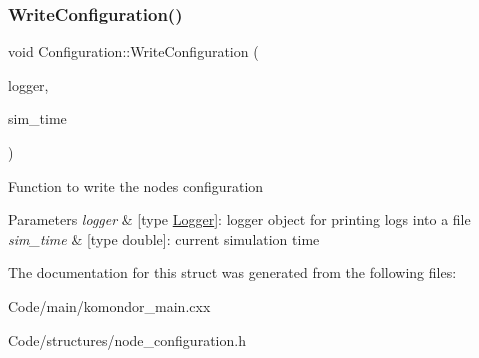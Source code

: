 \subsubsection{\texorpdfstring{Write\+Configuration()}{WriteConfiguration()}}
{\footnotesize\ttfamily void Configuration\+::\+Write\+Configuration (\begin{DoxyParamCaption}\item[{\hyperlink{structLogger}{Logger}}]{logger,  }\item[{double}]{sim\+\_\+time }\end{DoxyParamCaption})\hspace{0.3cm}{\ttfamily [inline]}}

Function to write the node\textquotesingle{}s configuration 
\begin{DoxyParams}{Parameters}
{\em logger} & \mbox{[}type \hyperlink{structLogger}{Logger}\mbox{]}\+: logger object for printing logs into a file \\
\hline
{\em sim\+\_\+time} & \mbox{[}type double\mbox{]}\+: current simulation time \\
\hline
\end{DoxyParams}


The documentation for this struct was generated from the following files\+:\begin{DoxyCompactItemize}
\item 
Code/main/komondor\+\_\+main.\+cxx\item 
Code/structures/node\+\_\+configuration.\+h\end{DoxyCompactItemize}
